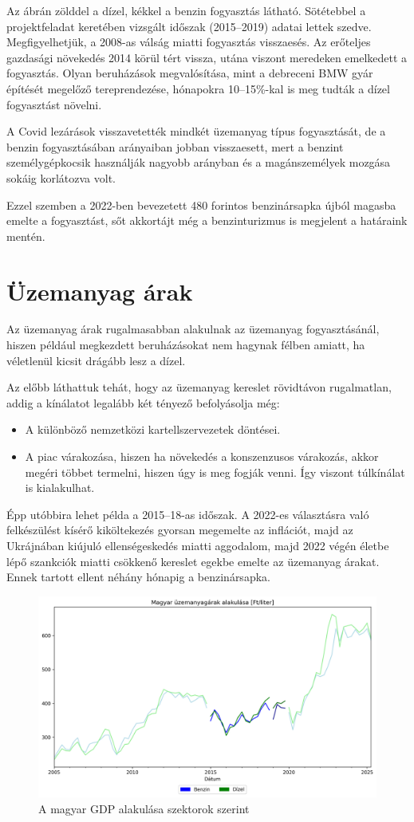 Az ábrán zölddel a dízel, kékkel a benzin fogyasztás látható. Sötétebbel a projektfeladat keretében
vizsgált időszak (2015--2019) adatai lettek szedve. Megfigyelhetjük, a 2008-as válság miatti
fogyasztás visszaesés. Az erőteljes gazdasági növekedés 2014 körül tért vissza, utána viszont
meredeken emelkedett a fogyasztás. Olyan beruházások megvalósítása, mint a debreceni BMW gyár
építését megelőző tereprendezése, hónapokra 10--15\%-kal is meg tudták a dízel fogyasztást növelni.

A Covid lezárások visszavetették mindkét üzemanyag típus fogyasztását, de a benzin fogyasztásában
arányaiban jobban visszaesett, mert a benzint személygépkocsik használják nagyobb arányban és a
magánszemélyek mozgása sokáig korlátozva volt.

Ezzel szemben a 2022-ben bevezetett 480 forintos benzinársapka újból magasba emelte a fogyasztást,
sőt akkortájt még a benzinturizmus is megjelent a határaink mentén.

\section{Üzemanyag árak}

Az üzemanyag árak rugalmasabban alakulnak az üzemanyag fogyasztásánál, hiszen például megkezdett
beruházásokat nem hagynak félben amiatt, ha véletlenül kicsit drágább lesz a dízel.

Az előbb láthattuk tehát, hogy az üzemanyag kereslet rövidtávon rugalmatlan, addig a kínálatot
legalább két tényező befolyásolja még:
\begin{itemize}
    \item A különböző nemzetközi kartellszervezetek döntései.
    \item A piac várakozása, hiszen ha növekedés a konszenzusos várakozás, akkor megéri többet termelni,
          hiszen úgy is meg fogják venni. Így viszont túlkínálat is kialakulhat.
\end{itemize}

Épp utóbbira lehet példa a 2015--18-as időszak. A 2022-es választásra való felkészülést kísérő
kiköltekezés gyorsan megemelte az inflációt, majd az Ukrájnában kiújuló ellenségeskedés miatti aggodalom,
majd 2022 végén életbe lépő szankciók miatti csökkenő kereslet egekbe emelte az üzemanyag árakat. Ennek tartott ellent néhány hónapig a benzinársapka.

\begin{figure}[htbp]
    \centering
    \includegraphics[width=1\textwidth, height=0.8\textheight, keepaspectratio]{../figures/petrol_prices.png}
    \caption{A magyar GDP alakulása szektorok szerint}\label{fig:petrol_prices}
\end{figure}